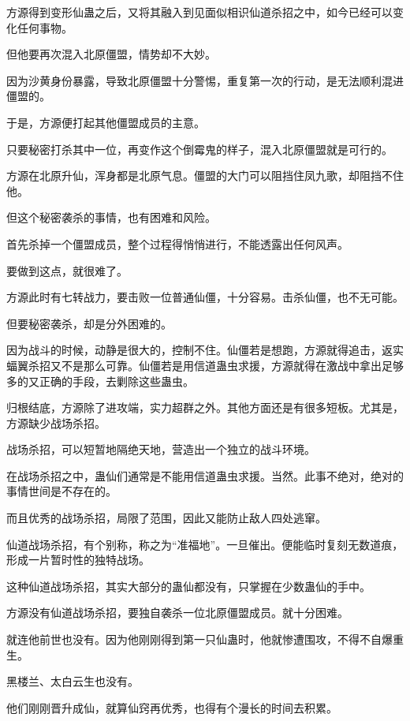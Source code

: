 
\begin{this_body}

方源得到变形仙蛊之后，又将其融入到见面似相识仙道杀招之中，如今已经可以变化任何事物。

但他要再次混入北原僵盟，情势却不大妙。

因为沙黄身份暴露，导致北原僵盟十分警惕，重复第一次的行动，是无法顺利混进僵盟的。

于是，方源便打起其他僵盟成员的主意。

只要秘密打杀其中一位，再变作这个倒霉鬼的样子，混入北原僵盟就是可行的。

方源在北原升仙，浑身都是北原气息。僵盟的大门可以阻挡住凤九歌，却阻挡不住他。

但这个秘密袭杀的事情，也有困难和风险。

首先杀掉一个僵盟成员，整个过程得悄悄进行，不能透露出任何风声。

要做到这点，就很难了。

方源此时有七转战力，要击败一位普通仙僵，十分容易。击杀仙僵，也不无可能。

但要秘密袭杀，却是分外困难的。

因为战斗的时候，动静是很大的，控制不住。仙僵若是想跑，方源就得追击，返实蝠翼杀招又不是那么可靠。仙僵若是用信道蛊虫求援，方源就得在激战中拿出足够多的又正确的手段，去剿除这些蛊虫。

归根结底，方源除了进攻端，实力超群之外。其他方面还是有很多短板。尤其是，方源缺少战场杀招。

战场杀招，可以短暂地隔绝天地，营造出一个独立的战斗环境。

在战场杀招之中，蛊仙们通常是不能用信道蛊虫求援。当然。此事不绝对，绝对的事情世间是不存在的。

而且优秀的战场杀招，局限了范围，因此又能防止敌人四处逃窜。

仙道战场杀招，有个别称，称之为“准福地”。一旦催出。便能临时复刻无数道痕，形成一片暂时性的独特战场。

这种仙道战场杀招，其实大部分的蛊仙都没有，只掌握在少数蛊仙的手中。

方源没有仙道战场杀招，要独自袭杀一位北原僵盟成员。就十分困难。

就连他前世也没有。因为他刚刚得到第一只仙蛊时，他就惨遭围攻，不得不自爆重生。

黑楼兰、太白云生也没有。

他们刚刚晋升成仙，就算仙窍再优秀，也得有个漫长的时间去积累。


\end{this_body}
